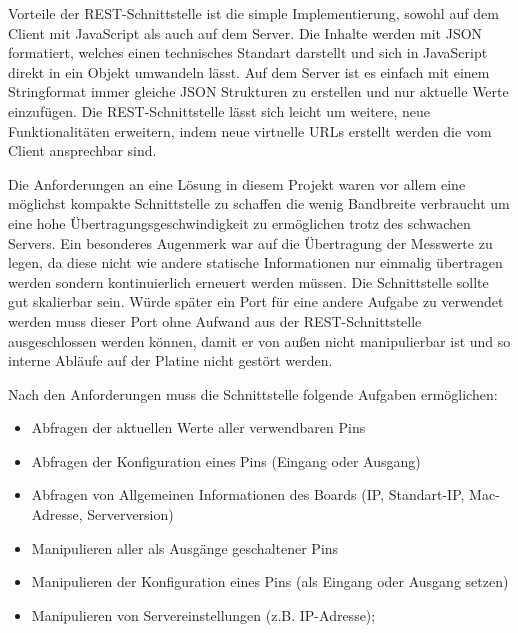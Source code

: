 Vorteile der REST-Schnittstelle ist die simple Implementierung, sowohl auf dem Client mit 
JavaScript als auch auf dem Server. Die Inhalte werden mit JSON formatiert, welches einen 
technisches Standart darstellt und sich in JavaScript direkt in ein Objekt umwandeln 
lässt. Auf dem Server ist es einfach mit einem Stringformat immer gleiche JSON Strukturen 
zu erstellen und nur aktuelle Werte einzufügen. Die REST-Schnittstelle lässt sich leicht 
um weitere, neue Funktionalitäten erweitern, indem neue virtuelle URLs erstellt werden die 
vom Client ansprechbar sind.

Die Anforderungen an eine Lösung in diesem Projekt waren vor allem eine möglichst kompakte 
Schnittstelle zu schaffen die wenig Bandbreite verbraucht um eine hohe 
Übertragungsgeschwindigkeit zu ermöglichen trotz des schwachen Servers. Ein besonderes 
Augenmerk war auf die Übertragung der Messwerte zu legen, da diese nicht wie andere 
statische Informationen nur einmalig übertragen werden sondern kontinuierlich erneuert 
werden müssen. Die Schnittstelle sollte gut skalierbar sein. Würde später ein Port für
eine andere Aufgabe zu verwendet werden muss dieser Port ohne Aufwand aus der 
REST-Schnittstelle ausgeschlossen werden können, damit er von außen nicht manipulierbar 
ist und so interne Abläufe auf der Platine nicht gestört werden.

Nach den Anforderungen muss die Schnittstelle folgende Aufgaben ermöglichen:
\begin{itemize}
\item Abfragen der aktuellen Werte aller verwendbaren Pins
\item Abfragen der Konfiguration eines Pins (Eingang oder Ausgang)
\item Abfragen von Allgemeinen Informationen des Boards (IP, Standart-IP, Mac-Adresse,
	Serverversion)
\item Manipulieren aller als Ausgänge geschaltener Pins
\item Manipulieren der Konfiguration eines Pins (als Eingang oder Ausgang setzen)
\item Manipulieren von Servereinstellungen (z.B. IP-Adresse);
\end{itemize}


